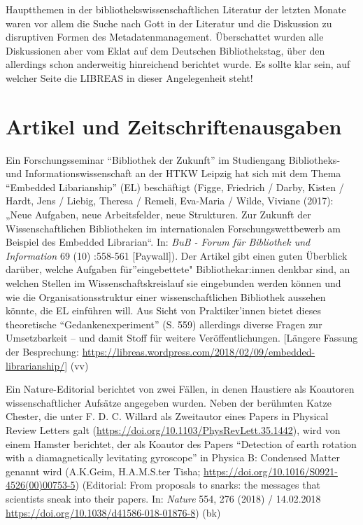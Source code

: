 \documentclass[a4paper,
fontsize=11pt,
oneside,
numbers=noperiodatend,
parskip=half-,
bibliography=totoc,
final
]{scrartcl}
\begin{document}
Hauptthemen in der bibliothekswissenschaftlichen Literatur der letzten
Monate waren vor allem die Suche nach Gott in der Literatur und die
Diskussion zu disruptiven Formen des Metadatenmanagement. Überschattet
wurden alle Diskussionen aber vom Eklat auf dem Deutschen
Bibliothekstag, über den allerdings schon anderweitig hinreichend
berichtet wurde. Es sollte klar sein, auf welcher Seite die LIBREAS in
dieser Angelegenheit steht!

\hypertarget{artikel-und-zeitschriftenausgaben}{%
\section{Artikel und
Zeitschriftenausgaben}\label{artikel-und-zeitschriftenausgaben}}

Ein Forschungsseminar \enquote{Bibliothek der Zukunft} im Studiengang
Bibliotheks- und Informationswissenschaft an der HTKW Leipzig hat sich
mit dem Thema \enquote{Embedded Libarianship} (EL) beschäftigt (Figge,
Friedrich / Darby, Kisten / Hardt, Jens / Liebig, Theresa / Remeli,
Eva-Maria / Wilde, Viviane (2017): „Neue Aufgaben, neue Arbeitsfelder,
neue Strukturen. Zur Zukunft der Wissenschaftlichen Bibliotheken im
internationalen Forschungswettbewerb am Beispiel des Embedded
Librarian\enquote{. In: \emph{BuB - Forum für Bibliothek und
Information} 69 (10) :558-561 {[}Paywall{]}). Der Artikel gibt einen
guten Überblick darüber, welche Aufgaben für}eingebettete"
Bibliothekar:innen denkbar sind, an welchen Stellen im
Wissenschaftskreislauf sie eingebunden werden können und wie die
Organisationsstruktur einer wissenschaftlichen Bibliothek aussehen
könnte, die EL einführen will. Aus Sicht von Praktiker'innen bietet
dieses theoretische \enquote{Gedankenexperiment} (S. 559) allerdings
diverse Fragen zur Umsetzbarkeit -- und damit Stoff für weitere
Veröffentlichungen. {[}Längere Fassung der Besprechung:
\url{https://libreas.wordpress.com/2018/02/09/embedded-librarianship/}{]}
(vv)

Ein Nature-Editorial berichtet von zwei Fällen, in denen Haustiere als
Koautoren wissenschaftlicher Aufsätze angegeben wurden. Neben der
berühmten Katze Chester, die unter F. D. C. Willard als Zweitautor eines
Papers in Physical Review Letters galt
(\url{https://doi.org/10.1103/PhysRevLett.35.1442}), wird von einem
Hamster berichtet, der als Koautor des Papers \enquote{Detection of
earth rotation with a diamagnetically levitating gyroscope} in Physica
B: Condensed Matter genannt wird (A.K.Geim, H.A.M.S.ter Tisha;
\url{https://doi.org/10.1016/S0921-4526(00)00753-5}) (Editorial: From
proposals to snarks: the messages that scientists sneak into their
papers. In: \emph{Nature} 554, 276 (2018) / 14.02.2018
\url{https://doi.org/10.1038/d41586-018-01876-8}) (bk)
\end{document}
